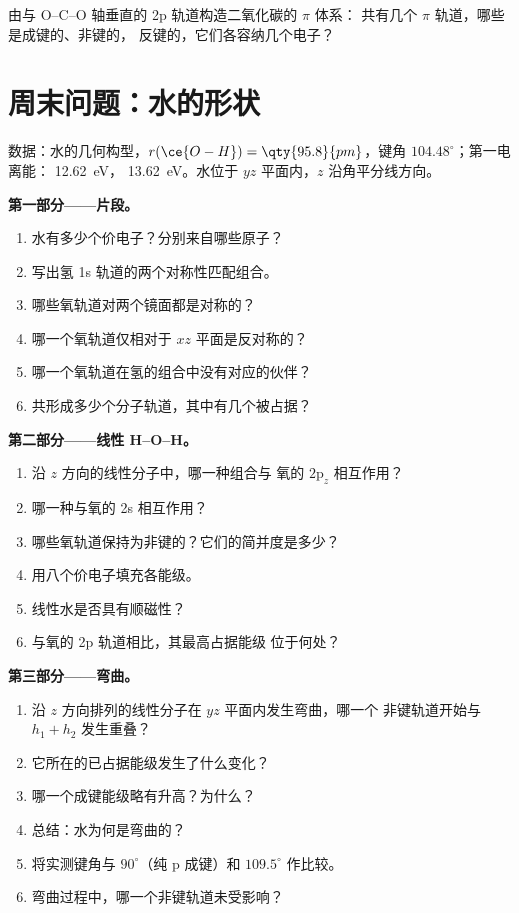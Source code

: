 \begin{exercise}[$\star\star\star$]\label{exo:b2:fragment-orbitals:12}
由与 O--C--O 轴垂直的 2p 轨道构造二氧化碳的 $\pi$ 体系：
共有几个 $\pi$ 轨道，哪些是成键的、非键的，
反键的，它们各容纳几个电子？
\end{exercise}

\section{周末问题：水的形状}

\begin{problem}
\label{pb:b2:fragment-orbitals:1}
数据：水的几何构型，$r(\ce{O-H}) = \qty{95.8}{pm}$，键角
$104.48^\circ$；第一电离能： \qty{12.62}{eV}，
\qty{13.62}{eV}。水位于 $yz$ 平面内，$z$ 沿角平分线方向。

\medskip
\noindent\textbf{第一部分——片段。}
\begin{enumerate}
  \item 水有多少个价电子？分别来自哪些原子？
  \item 写出氢 1s 轨道的两个对称性匹配组合。
  \item 哪些氧轨道对两个镜面都是对称的？
  \item 哪一个氧轨道仅相对于 $xz$ 平面是反对称的？
  \item 哪一个氧轨道在氢的组合中没有对应的伙伴？
  \item 共形成多少个分子轨道，其中有几个被占据？
\end{enumerate}

\medskip
\noindent\textbf{第二部分——线性 H--O--H。}
\begin{enumerate}[resume]
  \item 沿 $z$ 方向的线性分子中，哪一种组合与
        氧的 $2\mathrm p_z$ 相互作用？
  \item 哪一种与氧的 2s 相互作用？
  \item 哪些氧轨道保持为非键的？它们的简并度是多少？
  \item 用八个价电子填充各能级。
  \item 线性水是否具有顺磁性？
  \item 与氧的 2p 轨道相比，其最高占据能级
        位于何处？
\end{enumerate}

\medskip
\noindent\textbf{第三部分——弯曲。}
\begin{enumerate}[resume]
  \item 沿 $z$ 方向排列的线性分子在 $yz$ 平面内发生弯曲，哪一个
        非键轨道开始与 $h_1 + h_2$ 发生重叠？
  \item 它所在的已占据能级发生了什么变化？
  \item 哪一个成键能级略有升高？为什么？
  \item 总结：水为何是弯曲的？
  \item 将实测键角与 $90^\circ$（纯 p 成键）和 $109.5^\circ$ 作比较。
  \item 弯曲过程中，哪一个非键轨道未受影响？
\end{enumerate}


\end{problem}
